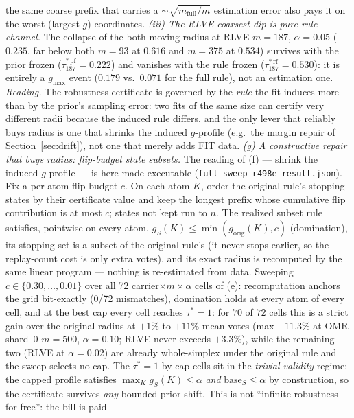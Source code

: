 \documentclass{article}
\theoremstyle{definition}
\theoremstyle{remark}
\begin{document}
the same coarse prefix that carries a $\sim\!\sqrt{m_{\mathrm{full}}/m}$
estimation error also pays it on the worst (largest-$g$) coordinates.
\emph{(iii) The RLVE coarsest dip is pure rule-channel.} The collapse of
the both-moving radius at RLVE $m{=}187$, $\alpha{=}0.05$ ($0.235$, far
below both $m{=}93$ at $0.616$ and $m{=}375$ at $0.534$) survives with
the prior frozen ($\tau^{*\,\mathrm{pf}}_{187}=0.222$) and vanishes with
the rule frozen ($\tau^{*\,\mathrm{rf}}_{187}=0.530$): it is entirely a
$g_{\max}$ event ($0.179$ vs.\ $0.071$ for the full rule), not an
estimation one. \emph{Reading.} The robustness certificate is governed by
the \emph{rule} the fit induces more than by the prior's sampling error:
two fits of the same size can certify very different radii because the
induced rule differs, and the only lever that reliably buys radius is one
that shrinks the induced $g$-profile (e.g.\ the margin repair of
Section~\ref{sec:drift}), not one that merely adds FIT data.
\emph{(g) A constructive repair that buys radius: flip-budget state
subsets.} The reading of (f) --- shrink the induced $g$-profile --- is
here made executable
(\texttt{full\_sweep\_r498e\_result.json}). Fix a per-atom flip budget
$c$. On each atom $K$, order the original rule's stopping states by
their certificate value and keep the longest prefix whose cumulative
flip contribution is at most $c$; states not kept run to $n$. The
realized subset rule satisfies, pointwise on every atom,
$g_S(K)\le\min(g_{\mathrm{orig}}(K),c)$ (domination), its stopping set
is a subset of the original rule's (it never stops earlier, so the
replay-count cost is only extra votes), and its exact radius is
recomputed by the same linear program --- nothing is re-estimated from
data. Sweeping $c\in\{0.30,\dots,0.01\}$ over all 72
carrier$\times m\times\alpha$ cells of (e): recomputation anchors the
grid bit-exactly (0/72 mismatches), domination holds at every atom of
every cell, and at the best cap every cell reaches $\tau^*=1$: for
$70$ of $72$ cells this is a strict gain over the original radius at
$+1\%$ to $+11\%$ mean votes (max $+11.3\%$ at OMR
shard~0 $m{=}500$, $\alpha{=}0.10$; RLVE never exceeds $+3.3\%$),
while the remaining two (RLVE at $\alpha{=}0.02$) are already
whole-simplex under the original rule and the sweep selects no cap.
The $\tau^*=1$-by-cap cells sit in the
\emph{trivial-validity} regime: the capped profile satisfies
$\max_K g_S(K)\le\alpha$ \emph{and} $\mathrm{base}_S\le\alpha$ by
construction, so the certificate survives \emph{any} bounded prior
shift. This is not ``infinite robustness for free'': the bill is paid
\end{document}
